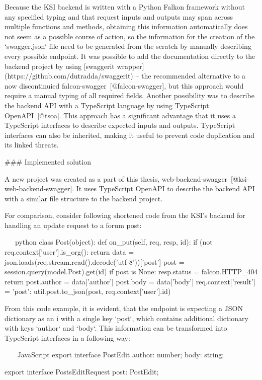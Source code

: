\documentclass[
  digital, %
  oneside, %
  lof,     %
  lot,     %
]{fithesis4}
\begin{document}
Because the KSI backend is written with a Python Falkon framework without any specified typing and that request inputs and outputs may span across multiple functions and methods, obtaining this information automatically does not seem as a possible course of action, so the information for the creation of the `swagger.json` file need to be generated from the scratch by manually describing every possible endpoint. It was possible to add the documentation directly to the backend project by using [swaggerit wrapper](https://github.com/dutradda/swaggerit) -- the recommended alternative to a now discontinuied falcon-swagger~[@falcon-swagger], but this approach would require a manual typing of all required fields. Another possibility was to describe the backend API with a TypeScript language by using TypeScript OpenAPI~[@tsoa]. This approach has a significant advantage that it uses a TypeScript interfaces to describe expected inputs and outputs. TypeScript interfaces can also be inherited, making it useful to prevent code duplication and its linked threats.

### Implemented solution

A new project was created as a part of this thesis, web-backend-swagger~[@ksi-web-backend-swagger]. It uses TypeScript OpenAPI to describe the backend API with a similar file structure to the backend project. 

For comparison, consider following shortened code from the KSI's backend for handling an update request to a forum post:

\newpage
~~~python
class Post(object):
    def on_put(self, req, resp, id):
        if (not req.context['user'].is_org():
            return
        data = json.loads(req.stream.read().decode('utf-8'))['post']
        post = session.query(model.Post).get(id)
        if post is None:
            resp.status = falcon.HTTP_404
            return
        post.author = data['author']
        post.body = data['body']
        req.context['result'] = {'post': util.post.to_json(post, req.context['user'].id)}
~~~


From this code example, it is evident, that the endpoint is expecting a JSON dictionary as an i with a single key `post`, which contains additional dictionary with keys `author` and `body`. This information can be transformed into TypeScript interfaces in a following way:


~~~ JavaScript
export interface PostEdit {
    author: number;
    body: string;
}

export interface PostsEditRequest {
    post: PostEdit;
}
~~~
\end{document}

